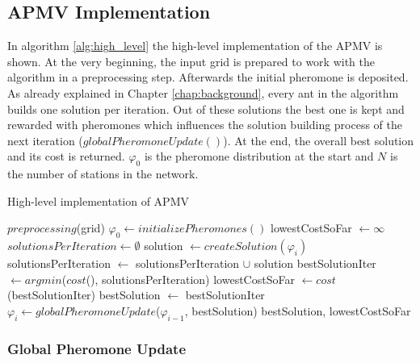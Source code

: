 \subsection{APMV Implementation}
In algorithm \ref{alg:high_level} the high-level implementation of the APMV is shown. At the very beginning, the input grid is prepared to work with the algorithm in a preprocessing step. Afterwards the initial pheromone is deposited. As already explained in Chapter \ref{chap:background}, every ant in the algorithm builds one solution per iteration. Out of these solutions the best one is kept and rewarded with pheromones which influences the solution building process of the next iteration ($globalPheromoneUpdate()$). At the end, the overall best solution and its cost is returned. $\varphi_0$ is the pheromone distribution at the start and $N$ is the number of stations in the network.

\begin{algorithm}[h]
	\caption{High-level implementation of APMV}
	\label{alg:high_level}
	\begin{algorithmic}[1]
		\State $preprocessing$(grid) 
		\State $\varphi_0 \gets initializePheromones()$ 
		\State lowestCostSoFar $\gets \infty$ 
		\State $solutionsPerIteration \gets \emptyset$
		\State solution $\gets createSolution(\varphi_i)$
		\State solutionsPerIteration $\gets$ solutionsPerIteration $\cup$ solution
		\EndFor
		\State bestSolutionIter $\gets argmin$($cost$(), solutionsPerIteration)
		\State lowestCostSoFar $\gets cost$(bestSolutionIter)
		\State bestSolution $\gets$ bestSolutionIter
		\EndIf
		\State $\varphi_i \gets globalPheromoneUpdate$($\varphi_{i-1}$, bestSolution)
		\EndFor
		\State \Return bestSolution, lowestCostSoFar
	\end{algorithmic}
\end{algorithm}

\subsubsection{Global Pheromone Update}

